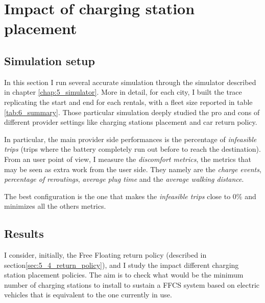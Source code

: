 \section{Impact of charging station placement}
\label{sec:6_5_freefloating}

\subsection{Simulation setup}
In this section I run several accurate simulation through the simulator described in chapter \ref{chap:5_simulator}. More in detail, for each city, I built the trace replicating the start and end for each rentals, with a fleet size reported in table \ref{tab:6_summary}. Those particular simulation deeply studied the pro and cons of different provider settings like charging stations placement and car return policy.

In particular, the main provider side performances is the percentage of \textit{infeasible trips} (trips where the battery completely run out before to reach the destination). From an user point of view, I measure the \textit{discomfort metrics}, the metrics that may be seen as extra work from the user side. They namely are the \textit{charge events}, \textit{percentage of reroutings}, \textit{average plug time} and the \textit{average walking distance}. 

The best configuration is the one that makes the \textit{infeasible trips} close to 0\% and minimizes all the others metrics.

\subsection{Results}

I consider, initially,  the Free Floating return policy (described in section\ref{sec:5_4_return_policy}), and I study the impact different charging station placement policies. The aim is to check what would be the minimum number of charging stations to install to sustain a FFCS system based on electric vehicles that is equivalent to the one currently in use.

